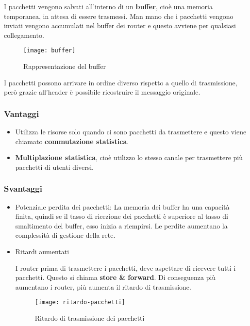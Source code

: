 \documentclass[a4paper]{article}
\begin{document}
\noindent I pacchetti vengono salvati all'interno di un \textbf{buffer}, cioè una
memoria temporanea, in attesa di essere trasmessi. Man mano che i pacchetti
vengono inviati vengono accumulati nel buffer dei router e questo avviene per
qualsiasi collegamento.
\begin{figure}[H]
  \centering
  \texttt{[image: buffer]}
  \caption{Rappresentazione del buffer}
\end{figure}

\noindent
I pacchetti possono arrivare in ordine diverso rispetto a quello di trasmissione,
però grazie all'header è possibile ricostruire il messaggio originale.

\subsubsection{Vantaggi}
\begin{itemize}
  \item Utilizza le risorse solo quando ci sono pacchetti da trasmettere e questo
    viene chiamato \textbf{commutazione statistica}.
  \item \textbf{Multiplazione statistica}, cioè utilizzo lo stesso
    canale per trasmettere più pacchetti di utenti diversi.
\end{itemize}

\subsubsection{Svantaggi}
\begin{itemize}
  \item Potenziale perdita dei pacchetti: La memoria dei buffer ha una capacità finita,
    quindi se il tasso di ricezione dei pacchetti è superiore al tasso di
    smaltimento del buffer, esso inizia a riempirsi. Le perdite aumentano la
    complessità di gestione della rete.

  \item Ritardi aumentati

    \noindent
    I router prima di trasmettere i pacchetti, deve aspettare di ricevere tutti
    i pacchetti. Questo si chiama \textbf{store \& forward}. Di conseguenza
    più aumentano i router, più aumenta il ritardo di trasmissione.
    \begin{figure}[H]
      \centering
      \texttt{[image: ritardo-pacchetti]}
      \caption{Ritardo di trasmissione dei pacchetti}
    \end{figure}
\end{itemize}
\end{document}
